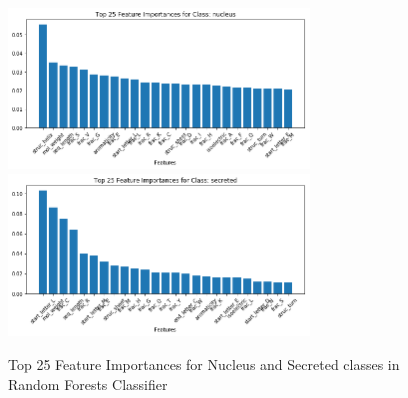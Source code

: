\documentclass{bioinfo}
\begin{document}


\begin{figure}[t]
\includegraphics[width=8cm]{nucleus_import}
\centering
\includegraphics[width=8cm]{secreted_import}
\caption{Top 25 Feature Importances for Nucleus and Secreted classes in Random Forests Classifier}
\label{fig:import2}
\centering
\end{figure}
\end{document}
